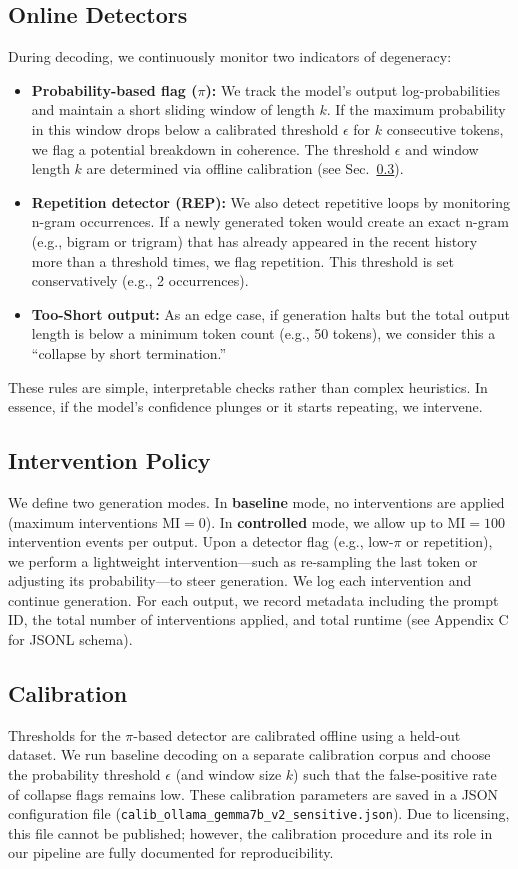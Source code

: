 \documentclass{article}
\begin{document}
\subsection{Online Detectors}
During decoding, we continuously monitor two indicators of degeneracy:
\begin{itemize}
  \item \textbf{Probability-based flag ($\pi$):} We track the model's output log-probabilities and maintain a short sliding window of length $k$. If the maximum probability in this window drops below a calibrated threshold $\epsilon$ for $k$ consecutive tokens, we flag a potential breakdown in coherence. The threshold $\epsilon$ and window length $k$ are determined via offline calibration (see Sec.~\ref{sec:calibration}).
  \item \textbf{Repetition detector (REP):} We also detect repetitive loops by monitoring n-gram occurrences. If a newly generated token would create an exact n-gram (e.g., bigram or trigram) that has already appeared in the recent history more than a threshold times, we flag repetition. This threshold is set conservatively (e.g., 2 occurrences).
  \item \textbf{Too-Short output:} As an edge case, if generation halts but the total output length is below a minimum token count (e.g., 50 tokens), we consider this a ``collapse by short termination.''
\end{itemize}
These rules are simple, interpretable checks rather than complex heuristics. In essence, if the model's confidence plunges or it starts repeating, we intervene.

\subsection{Intervention Policy}
We define two generation modes. In \textbf{baseline} mode, no interventions are applied (maximum interventions $\text{MI}=0$). In \textbf{controlled} mode, we allow up to $\text{MI}=100$ intervention events per output. Upon a detector flag (e.g., low-$\pi$ or repetition), we perform a lightweight intervention---such as re-sampling the last token or adjusting its probability---to steer generation. We log each intervention and continue generation. For each output, we record metadata including the prompt ID, the total number of interventions applied, and total runtime (see Appendix C for JSONL schema).

\subsection{Calibration}
\label{sec:calibration}
Thresholds for the $\pi$-based detector are calibrated offline using a held-out dataset. We run baseline decoding on a separate calibration corpus and choose the probability threshold $\epsilon$ (and window size $k$) such that the false-positive rate of collapse flags remains low. These calibration parameters are saved in a JSON configuration file (\texttt{calib\_ollama\_gemma7b\_v2\_sensitive.json}). Due to licensing, this file cannot be published; however, the calibration procedure and its role in our pipeline are fully documented for reproducibility.
\end{document}
